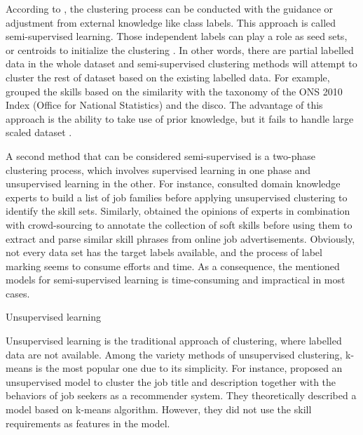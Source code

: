 \documentclass[a4paper,man,floatsintext,natbib,noextraspace]{apa6}
\makeatletter
\renewcommand{\subsubsection}{\@startsection{subsubsection}{3}
  {\z@}
  {\b@level@two@skip}
  {\e@level@two@skip}
  {\normalfont\normalsize\bfseries\itshape}}
\makeatother
\begin{document}
According to \cite{griraUnsupervisedSemisupervisedClustering2005}, the clustering process can be conducted with the guidance or adjustment from external knowledge like class labels. This approach is called semi-supervised learning. Those independent labels can play a role as seed sets, or centroids to initialize the clustering \citep{qinResearchProgressSemiSupervised2019}. In other words, there are partial labelled data in the whole dataset and semi-supervised clustering methods will attempt to cluster the rest of dataset based on the existing labelled data. For example, \cite{djumalievaClassifyingOccupationsAccording2018} grouped the skills based on the similarity with the taxonomy of the ONS 2010 Index (Office for National Statistics) and the \gls{disco}. The advantage of this approach is the ability to take use of prior knowledge, but it fails to handle large scaled dataset \citep{reddySemisupervisedLearningBrief2018}.

A second method that can be considered semi-supervised is a two-phase clustering process, which involves supervised learning in one phase and unsupervised learning in the other. For instance, \cite{demauroHumanResourcesBig2018} consulted domain knowledge experts to build a list of job families before applying unsupervised clustering to identify the skill sets. Similarly, \cite{calancaResponsibleTeamPlayers2019} obtained the opinions of experts in combination with crowd-sourcing to annotate the collection of soft skills before using them to extract and parse similar skill phrases from online job advertisements. Obviously, not every data set has the target labels available, and the process of label marking seems to consume efforts and time. As a consequence, the mentioned models for semi-supervised learning is time-consuming and impractical in most cases.

\subsubsection{Unsupervised learning}

Unsupervised learning is the traditional approach of clustering, where labelled data are not available. Among the variety methods of unsupervised clustering, k-means is the most popular one due to its simplicity. For instance, \cite{mhamdiJobRecommendationBased2020} proposed an unsupervised model to cluster the job title and description together with the behaviors of job seekers as a recommender system. They theoretically described a model based on k-means algorithm. However, they did not use the skill requirements as features in the model.
\end{document}
